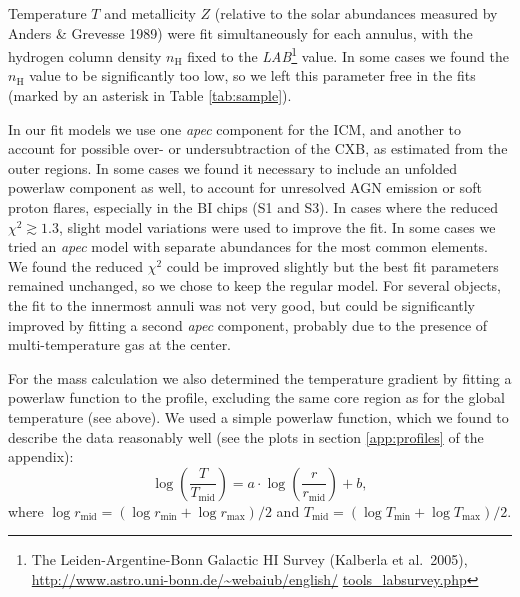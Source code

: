 \documentclass[structabstract]{aa}
\begin{document}
Temperature $T$ and metallicity $Z$ (relative to the solar abundances
  measured by Anders \& Grevesse 1989) were fit simultaneously for each
annulus, with the hydrogen column density $n_{\text{H}}$ fixed to the
\emph{LAB}\footnote{The Leiden-Argentine-Bonn Galactic HI Survey (Kalberla et
  al.\ 2005),
  \url{http://www.astro.uni-bonn.de/~webaiub/english/} 
\url{tools_labsurvey.php}}
value. In some cases we found the $n_{\text{H}}$ value to be
significantly too low, so we left this parameter free in the fits (marked by
an asterisk in Table \ref{tab:sample}).

In our fit models we use one \emph{apec} component for the ICM, and
another to account for possible over- or undersubtraction of the CXB,
as estimated from the outer regions. In some cases we found it
necessary to include an unfolded powerlaw component as well, to
account for unresolved AGN emission or soft proton flares, especially
in the BI chips (S1 and S3). In cases where the reduced $\chi^2
\gtrsim 1.3$, slight model variations were used to improve the fit. In
some cases we tried an \emph{apec} model with separate abundances for
the most common elements. We found the reduced $\chi^2$ could be
improved slightly but the best fit parameters remained unchanged, so
we chose to keep the regular model. For several objects, the fit to
the innermost annuli was not very good, but could be significantly
improved by fitting a second \emph{apec} component, probably due to
the presence of multi-temperature gas at the center.

For the mass calculation we also determined the temperature gradient
by fitting a powerlaw function to the profile, excluding the same core
region as for the global temperature (see above). We used a simple
powerlaw function, which we found to describe the data reasonably well
(see the plots in section \ref{app:profiles} of the appendix):
\begin{equation}\label{eqn:tprofile}
\log \left( \frac{T}{T_{\text{mid}}} \right)=a \cdot \log \left( \frac{r}{r_{\text{mid}}} \right)+b,
\end{equation}
where $\log r_{\text{mid}}=(\log r_{\text{min}}+\log
r_{\text{max}})/2$ and $T_{\text{mid}}=(\log T_{\text{min}}+\log
T_{\text{max}})/2$.
%
\end{document}
